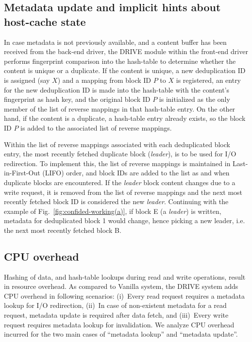 \subsection{Metadata update and implicit hints about host-cache state}
In case metadata is not previously available, and a content
buffer has been received from the back-end driver, the DRIVE module
within the front-end driver performs fingerprint comparison into the
hash-table to determine whether the content is unique or a duplicate.
If the content is unique, a new deduplication ID is assigned (say $X$) and a
mapping from block ID $P$ to $X$ is registered, an entry for the new 
deduplication ID
is made into the hash-table with the content's fingerprint as hash key,
and the original block ID $P$ is initialized as the only member of the
list of reverse mappings in that hash-table entry.
On the other hand, if the content is a duplicate, a hash-table 
entry already exists, so the block ID $P$ is added to the associated
list of reverse mappings.

Within the list of reverse mappings associated with each deduplicated
block entry, the most recently fetched duplicate block (\textit{leader}), 
is to be used for I/O redirection. 
To implement this, the list of reverse mappings is maintained in 
Last-in-First-Out (LIFO)
order, and block IDs are added to the list
as and when duplicate blocks are encountered.
If the \textit{leader} block content
changes due to a write request, it is removed from the list of reverse
mappings and the next most recently fetched block ID is considered the 
new \textit{leader}.
Continuing with the example of Fig.~\ref{fig:confided-working(a)}, 
if block E (a \textit{leader}) is written, 
metadata for deduplicated block 1 would change,
hence picking a new leader, i.e. the next most recently fetched block B.


\subsection{CPU overhead}
\label{sec:drivechap-cpuoverhead}
Hashing of data, and hash-table lookups
during read and write operations, result in resource overhead.
As compared to Vanilla system, the DRIVE system adds CPU overhead
in following scenarios: (i)~Every read request requires a metadata
lookup for I/O redirection, (ii)~In case of non-existent metadata for a
read request, metadata update is required after data fetch, and 
(iii)~Every write request requires metadata lookup for invalidation. 
We analyze CPU overhead incurred for the two main cases of 
``metadata lookup'' and ``metadata update''.

